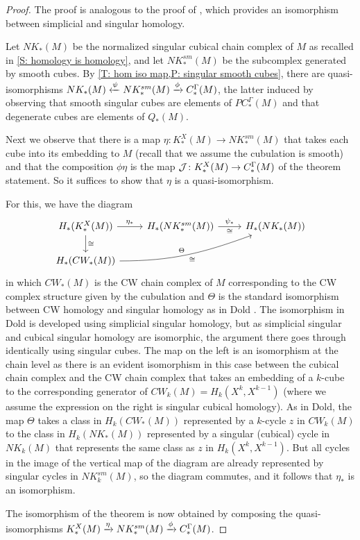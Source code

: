 \begin{proof}
	The proof is analogous to the proof of \cite[Proposition V.8.3]{Dol72}, which provides an isomorphism between simplicial and singular homology.

	Let $NK_*(M)$ be the normalized singular cubical chain complex of $M$ as recalled in \cref{S: homology is homology}, and let $NK^{sm}_*(M)$ be the subcomplex generated by smooth cubes.
	By \cref{T: hom iso map,P: singular smooth cubes}, there are quasi-isomorphisms $NK_*(M) \xleftarrow{\psi} NK^{sm}_*(M) \xrightarrow{\phi} C^\Gamma_*(M)$, the latter induced by observing that smooth singular cubes are elements of $PC^\Gamma_*(M)$ and that degenerate cubes are elements of $Q_*(M)$.

	Next we observe that there is a map $\eta: K^X_*(M) \to NK^{sm}_*(M)$ that takes each cube into its embedding to $M$ (recall that we assume the cubulation is smooth) and that the composition $\phi\eta$ is the map $\mathcal{J} \colon K^X_*(M) \to C^\Gamma_*(M)$ of the theorem statement.
	So it suffices to show that $\eta$ is a quasi-isomorphism.

	For this, we have the diagram
	\[
	\begin{tikzcd}
		H_*(K^X_*(M)) \arrow[r, "\eta_*"] \arrow[d, "\cong"] & H_*(NK^{sm}_*(M)) \arrow[r, "\psi_*", "\cong"'] & H_*(NK_*(M)) \\
		H_*(CW_*(M)) \arrow[rru, "\Theta", "\cong"', out=0, in=200] & &
	\end{tikzcd}
	\]
	in which $CW_*(M)$ is the CW chain complex of $M$ corresponding to the CW complex structure given by the cubulation and $\Theta$ is the standard isomorphism between CW homology and singular homology as in Dold \cite[Proposition V.1.9]{Dol72}.
	The isomorphism in Dold is developed using simplicial singular homology, but as simplicial singular and cubical singular homology are isomorphic, the argument there goes through identically using singular cubes.
	The map on the left is an isomorphism at the chain level as there is an evident isomorphism in this case between the cubical chain complex and the CW chain complex that takes an embedding of a $k$-cube to the corresponding generator of $CW_k(M) = H_k(X^k, X^{k-1})$ (where we assume the expression on the right is singular cubical homology).
	As in Dold, the map $\Theta$ takes a class in $H_k(CW_*(M))$ represented by a $k$-cycle $z$ in $CW_k(M)$ to the class in $H_k(NK_*(M))$ represented by a singular (cubical) cycle in $NK_k(M)$ that represents the same class as $z$ in $H_k(X^k,X^{k-1})$.
	But all cycles in the image of the vertical map of the diagram are already represented by singular cycles in $NK^{sm}_k(M)$, so the diagram commutes, and it follows that $\eta_*$ is an isomorphism.

	The isomorphism of the theorem is now obtained by composing the quasi-isomorphisms $K_*^X(M) \xrightarrow{\eta} NK^{sm}_*(M) \xrightarrow{\phi} C_*^\Gamma(M)$.
\end{proof}

